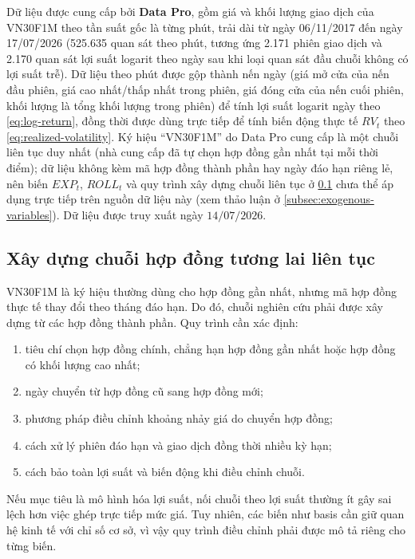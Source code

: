 \documentclass[12pt,a4paper]{article}
\numberwithin{equation}{section}
\begin{document}
Dữ liệu được cung cấp bởi \textbf{Data Pro}, gồm giá và khối lượng giao dịch của VN30F1M theo tần suất gốc là từng phút, trải dài từ ngày 06/11/2017 đến ngày 17/07/2026 (525.635 quan sát theo phút, tương ứng 2.171 phiên giao dịch và 2.170 quan sát lợi suất logarit theo ngày sau khi loại quan sát đầu chuỗi không có lợi suất trễ). Dữ liệu theo phút được gộp thành nến ngày (giá mở cửa của nến đầu phiên, giá cao nhất/thấp nhất trong phiên, giá đóng cửa của nến cuối phiên, khối lượng là tổng khối lượng trong phiên) để tính lợi suất logarit ngày theo \cref{eq:log-return}, đồng thời được dùng trực tiếp để tính biến động thực tế $RV_t$ theo \cref{eq:realized-volatility}. Ký hiệu ``VN30F1M'' do Data Pro cung cấp là một chuỗi liên tục duy nhất (nhà cung cấp đã tự chọn hợp đồng gần nhất tại mỗi thời điểm); dữ liệu không kèm mã hợp đồng thành phần hay ngày đáo hạn riêng lẻ, nên biến $EXP_t$, $ROLL_t$ và quy trình xây dựng chuỗi liên tục ở \cref{subsec:continuous-contract} chưa thể áp dụng trực tiếp trên nguồn dữ liệu này (xem thảo luận ở \cref{subsec:exogenous-variables}). Dữ liệu được truy xuất ngày $14/07/2026$.

\subsection{Xây dựng chuỗi hợp đồng tương lai liên tục}\label{subsec:continuous-contract}

VN30F1M là ký hiệu thường dùng cho hợp đồng gần nhất, nhưng mã hợp đồng thực tế thay đổi theo tháng đáo hạn. Do đó, chuỗi nghiên cứu phải được xây dựng từ các hợp đồng thành phần. Quy trình cần xác định:
\begin{enumerate}
  \item tiêu chí chọn hợp đồng chính, chẳng hạn hợp đồng gần nhất hoặc hợp đồng có khối lượng cao nhất;
  \item ngày chuyển từ hợp đồng cũ sang hợp đồng mới;
  \item phương pháp điều chỉnh khoảng nhảy giá do chuyển hợp đồng;
  \item cách xử lý phiên đáo hạn và giao dịch đồng thời nhiều kỳ hạn;
  \item cách bảo toàn lợi suất và biến động khi điều chỉnh chuỗi.
\end{enumerate}

Nếu mục tiêu là mô hình hóa lợi suất, nối chuỗi theo lợi suất thường ít gây sai lệch hơn việc ghép trực tiếp mức giá. Tuy nhiên, các biến như basis cần giữ quan hệ kinh tế với chỉ số cơ sở, vì vậy quy trình điều chỉnh phải được mô tả riêng cho từng biến.
\end{document}
